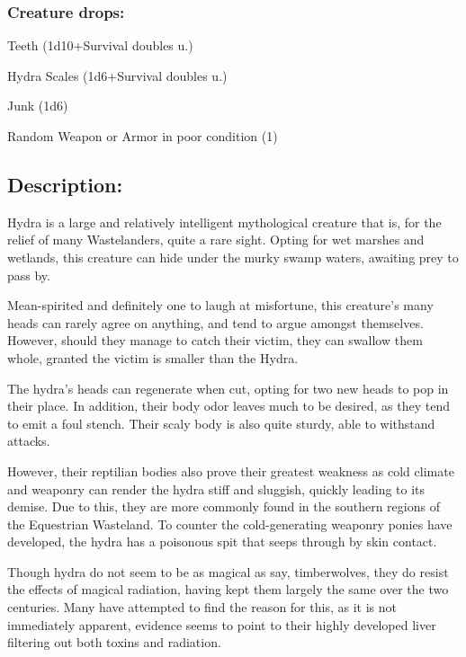 \documentclass[11pt,a4paper,twocolumn]{book}
\begin{document}
	\subsubsection*{Creature drops:}
	\begin{compactitem}
		\item Teeth (1d10+Survival doubles u.)
		\item Hydra Scales (1d6+Survival doubles u.)
		\item Junk (1d6)
		\item Random Weapon or Armor in poor condition (1)
	\end{compactitem}
	
	\subsection*{Description:}
	Hydra is a large and relatively intelligent mythological creature that is, for the relief of many Wastelanders, quite a rare sight. Opting for wet marshes and wetlands, this creature can hide under the murky swamp waters, awaiting prey to pass by.
	
	Mean-spirited and definitely one to laugh at misfortune, this creature's many heads can rarely agree on anything, and tend to argue amongst themselves. However, should they manage to catch their victim, they can swallow them whole, granted the victim is smaller than the Hydra.
	
	\bigskip
	The hydra's heads can regenerate when cut, opting for two new heads to pop in their place. In addition, their body odor leaves much to be desired, as they tend to emit a foul stench. Their scaly body is also quite sturdy, able to withstand attacks.
	
	However, their reptilian bodies also prove their greatest weakness as cold climate and weaponry can render the hydra stiff and sluggish, quickly leading to its demise. Due to this, they are more commonly found in the southern regions of the Equestrian Wasteland.
	To counter the cold-generating weaponry ponies have developed, the hydra has a poisonous spit that seeps through by skin contact. 
	
	Though hydra do not seem to be as magical as say, timberwolves, they do resist the effects of magical radiation, having kept them largely the same over the two centuries. Many have attempted to find the reason for this, as it is not immediately apparent, evidence seems to point to their highly developed liver filtering out both toxins and radiation. 
	
\end{document}
